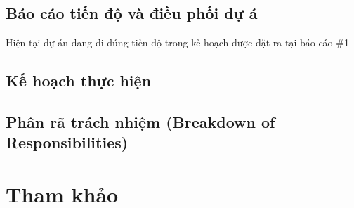 \documentclass[a4paper, 12pt]{article}
\begin{document}
\subsection{Báo cáo tiến độ và điều phối dự á}

Hiện tại dự án đang đi đúng tiến độ trong kế hoạch được đặt ra tại báo cáo \#1

\subsection{Kế hoạch thực hiện}

\subsection{Phân rã trách nhiệm (Breakdown of Responsibilities)}

\clearpage

\section{Tham khảo}
\clearpage
	
\end{document}
